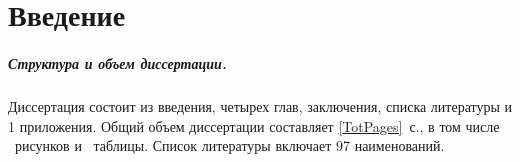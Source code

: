 
\chapter*{Введение}                         %



\paragraph*{Структура и объем диссертации.}
Диссертация состоит из введения,
четырех глав, заключения, списка литературы и 1 приложения.
Общий объем диссертации составляет \ref*{TotPages}~с.,
в том числе \totalfigures{}~рисунков и \totaltables{}~таблицы.
Список литературы включает 97 наименований.
